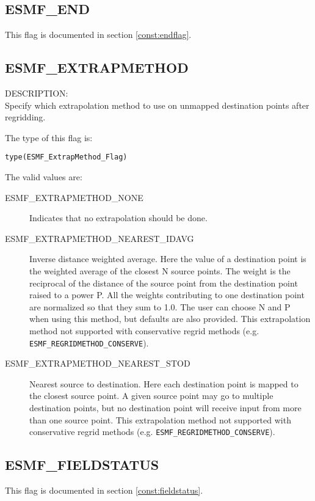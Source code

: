 \subsection{ESMF\_END}

This flag is documented in section \ref{const:endflag}.

\subsection{ESMF\_EXTRAPMETHOD}
\label{opt:extrapmethod}

{\sf DESCRIPTION:\\}  
Specify which extrapolation method to use on unmapped destination points after regridding. 

The type of this flag is:

{\tt type(ESMF\_ExtrapMethod\_Flag)}

The valid values are:
\begin{description}
\item [ESMF\_EXTRAPMETHOD\_NONE]
     Indicates that no extrapolation should be done. 
\item [ESMF\_EXTRAPMETHOD\_NEAREST\_IDAVG]
      Inverse distance weighted average. 
      Here the value of a destination point is the weighted average
      of the closest N source points. The weight is 
      the reciprocal of the distance of the source point from the destination point raised to a power P.
      All the weights contributing to one destination point are normalized so that they sum to 1.0. 
      The user can choose N and P when using this method, but defaults are also provided.  
      This extrapolation method not supported with conservative regrid methods 
      (e.g. {\tt ESMF\_REGRIDMETHOD\_CONSERVE}).
\item [ESMF\_EXTRAPMETHOD\_NEAREST\_STOD]
      Nearest source to destination. 
      Here each destination point is mapped to the closest source point. A given source point may go 
      to multiple destination points, but no destination point will receive input from more than
      one source point. This extrapolation method not supported with conservative regrid methods
      (e.g. {\tt ESMF\_REGRIDMETHOD\_CONSERVE}).
\end{description}

\subsection{ESMF\_FIELDSTATUS}
This flag is documented in section \ref{const:fieldstatus}.

